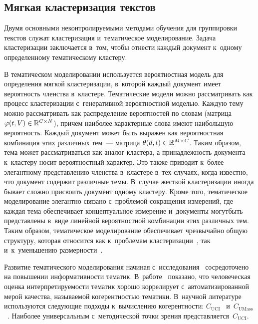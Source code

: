 \begin{multicols}{2}
    \subsection{Мягкая кластеризация текстов}
    
    Двумя основными неконтролируемыми методами обучения для группировки 
текстов служат клас\-те\-ри\-за\-ция и~тематическое моделирование.
    Задача кластеризации заключается в~том, чтобы отнести каждый документ 
    к~одному определенному тематическому кластеру.
    
    В тематическом моделировании  используется вероятностная модель для 
определения мягкой клас\-те\-ри\-за\-ции, в~которой каждый документ имеет вероятность 
членства в~кластере.
    Тематические модели можно рассматривать как процесс кластеризации 
    с~генеративной вероятностной моделью.
    Каж\-дую тему можно рассматривать как распределение вероятностей по словам 
(матрица $\varphi(t,V) \hm\in \mathbb{R}^{C \times N}$), причем наиболее 
характерные слова имеют наибольшую вероятность.
    Каждый документ может быть выражен как вероятностная комбинация этих 
различных тем~--- матрица $\theta (d,t) \hm\in \mathbb{R}^{M \times C} $.
    Таким образом, тема может рассматриваться как аналог кластера, а 
принадлежность документа к~кластеру носит вероятностный характер.
    Это также приводит к~более элегантному представлению членства в~кластере 
    в~тех случаях, когда известно, что документ содержит различные темы.
    В~случае жесткой кластеризации иногда бывает сложно присвоить документ 
одному кластеру.
    Кроме того, тематическое моделирование элегантно связано с~проб\-ле\-мой 
сокращения измерений, где каждая тема обеспечивает концептуальное измерение 
и~документы могут\linebreak быть представлены в~виде линейной вероятностной комбинации этих 
различных тем.
    Таким образом, тематическое моделирование обеспечивает чрезвычайно общую 
структуру, которая относится как к~проблемам кластеризации~\cite{kumar2017lda}, 
так и~к~уменьшению размерности~\cite{onan2017improved}.
    
    Развитие тематического моделирования начиная 
    с~исследования~\cite{hofmann1999probabilistic} сосредоточено на повышении информативности 
тематик.
    В~работе~\cite{roder2015exploring} показано, что человеческая оценка 
интерпретируемости тематик хорошо коррелирует с~автоматизированной мерой 
качества, называемой ко\-ге\-рент\-ностью тематики. 
    В~научной литературе используются следующие подходы к~вычислению 
когерентности: $C_{\mathrm{UCI}}$~\cite{Newman2010} 
и~$C_{\mathrm{UMass}}$~\cite{mimno2011optimizing}. 
    Наиболее универсальным с~методической точки зрения представляется~$C_{\mathrm{UCI}}$. 


\end{multicols}
